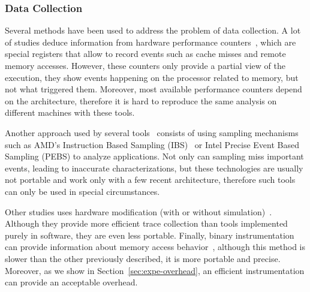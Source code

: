 \subsubsection{Data Collection}

Several methods have been used to address the problem of data collection. A
lot of studies deduce information from hardware performance
counters~\cite{Majo13(Mis)understanding,
Jiang14Understanding,Bosch00Rivet,Weyers14Visualization,Tao01Visualizing,DeRose01Hardware},
which are special registers that allow to record events such as cache misses and remote
memory accesses. However, these counters only provide a partial
view of the execution, they show events happening on the processor related to
memory, but not what triggered them. Moreover, most available performance counters
depend on the architecture, therefore it is hard to reproduce the same
analysis on different machines with these tools.

Another approach used by several
tools~\cite{Lachaize12MemProf,McCurdy10Memphis,Liu14Tool,Gimenez14Dissecting}
consists of using sampling mechanisms such as AMD's Instruction Based Sampling
(IBS)~\cite{Drongowski07Instructionbased} or Intel Precise Event Based
Sampling (PEBS) to analyze applications. Not only can sampling miss important events, leading to
inaccurate characterizations, but these technologies are usually not portable and work
only with a few recent architecture, therefore such tools can only be used in
special circumstances.

Other studies uses hardware modification (with or without simulation)~\cite{Bao08HMTT,Martonosi92MemSpy}.
Although they provide more efficient trace collection than tools implemented purely in software, they are even less portable.
Finally, binary instrumentation can provide information about memory access behavior~\cite{DeRose02SIGMA}, although this method is slower than
the other previously described, it is more portable and precise. Moreover, as
we show in Section~\ref{sec:expe-overhead}, an efficient instrumentation can
provide an acceptable overhead.
